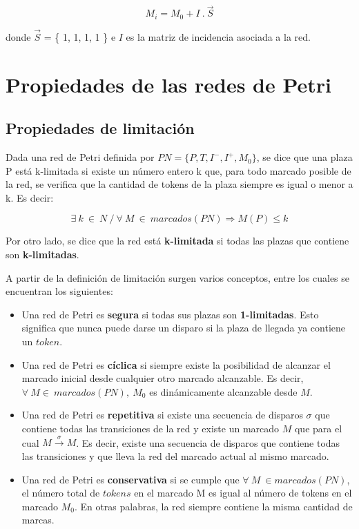 \begin{equation}
    M_i = M_0 + I \ . \ \vec{S}
\end{equation}

\noindent donde $\vec{S}$ = \{ 1, 1, 1, 1 \} e $I$ es la matriz de incidencia asociada a la red.

\section{Propiedades de las redes de Petri}
\subsection{Propiedades de limitación}
Dada una red de Petri definida por $PN = \{ P, T, I^-, I^+, M_0 \}$, se dice que una plaza P está k-limitada si existe un número entero k que, para todo marcado posible de la red, se verifica que la cantidad de tokens de la plaza siempre es igual o menor a k. Es decir:

\begin{equation}
    \exists \ k \ \in \ N \ / \ \forall \ M \ \in \ marcados (PN) \Rightarrow M(P) \leq k
\end{equation}

\noindent Por otro lado, se dice que la red está \textbf{k-limitada} si todas las plazas que contiene son \textbf{k-limitadas}. \\ \par

A partir de la definición de limitación surgen varios conceptos, entre los cuales se encuentran los siguientes:
\begin{itemize}
    \item Una red de Petri es \textbf{segura} si todas sus plazas son \textbf{1-limitadas}. Esto significa que nunca puede darse un disparo si la plaza de llegada ya contiene un $token$.
    \item Una red de Petri es \textbf{cíclica} si siempre existe la posibilidad de alcanzar el marcado inicial desde cualquier otro marcado alcanzable. Es decir, \break $\forall \ M  \in \ marcados(PN),\ M_0$ es dinámicamente alcanzable desde $M$.
    \item Una red de Petri es \textbf{repetitiva} si existe una secuencia de disparos $\sigma$ que contiene todas las transiciones de la red y existe un marcado $M$ que para el cual $M \xrightarrow{\sigma} M$. Es decir, existe una secuencia de disparos que contiene todas las transiciones y que lleva la red del marcado actual al mismo marcado.
    \item  Una red de Petri es \textbf{conservativa} si se cumple que $\forall \ M\ \in marcados (PN)$, el número total de $tokens$ en el marcado M es igual al número de tokens en el marcado $M_0$. En otras palabras, la red siempre contiene la misma cantidad de marcas.
    
\end{itemize}

